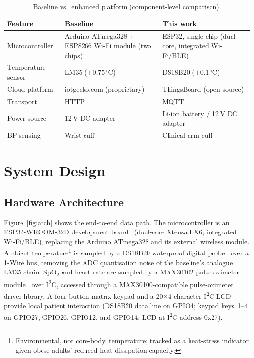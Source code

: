 \documentclass[pdflatex,sn-mathphys-num]{sn-jnl}
\begin{document}
\begin{table}[!htb]
\caption{Baseline vs.\ enhanced platform (component-level comparison).}\label{tab:compare}
\centering
\tiny
\begin{tabular}{@{}p{2.8cm}p{4.2cm}p{4.6cm}@{}}
\toprule
\textbf{Feature} & \textbf{Baseline~\cite{gupta2020}} & \textbf{This work}\\
\midrule
Microcontroller     & Arduino ATmega328 + ESP8266 Wi-Fi module (two chips) & ESP32, single chip (dual-core, integrated Wi-Fi/BLE)\\
Temperature sensor   & LM35 ($\pm0.75\,^\circ$C) & DS18B20 ($\pm0.1\,^\circ$C)\\
Cloud platform       & iotgecko.com (proprietary) & ThingsBoard (open-source)\\
Transport             & HTTP     & MQTT\footnotemark[1]\\
Power source          & 12\,V DC adapter       & Li-ion battery / 12\,V DC adapter\\
BP sensing             & Wrist cuff              & Clinical arm cuff\\
\bottomrule
\end{tabular}
\end{table}

\section{System Design}\label{sec:design}

\subsection{Hardware Architecture}

Figure~\ref{fig:arch} shows the end-to-end data path. The
microcontroller is an ESP32-WROOM-32D development board~\cite{espressif}
(dual-core Xtensa LX6, integrated Wi-Fi/BLE), replacing the Arduino
ATmega328 and its external wireless module. Ambient
temperature\footnote{Environmental, not core-body, temperature;
tracked as a heat-stress indicator given obese adults' reduced
heat-dissipation capacity.} is sampled by a DS18B20 waterproof
digital probe~\cite{ds18b20ds} over a 1-Wire bus, removing the ADC
quantisation noise of the baseline's analogue LM35 chain.
SpO\textsubscript{2} and heart rate are sampled
by a MAX30102 pulse-oximeter module~\cite{max30102ds} over
I\textsuperscript{2}C, accessed through a MAX30100-compatible
pulse-oximeter driver library. A four-button matrix keypad and a
20$\times$4 character I\textsuperscript{2}C LCD provide local patient
interaction (DS18B20 data line on GPIO4; keypad keys~1--4 on GPIO27,
GPIO26, GPIO12, and GPIO14; LCD at I\textsuperscript{2}C address
0x27).
\end{document}
